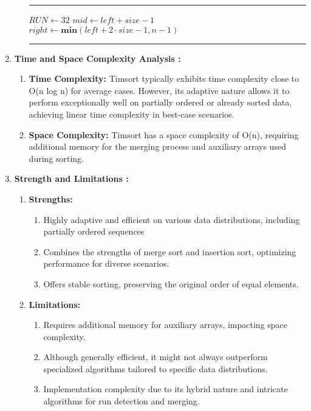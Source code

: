 \documentclass[conference]{IEEEtran}
\makeatletter
\newenvironment{breakablealgorithm}
  {%
     \refstepcounter{algorithm}%
     \hrule height.8pt depth0pt \kern2pt%
     \renewcommand{\caption}[2][\relax]{%
       {\raggedright\textbf{\fname@algorithm~\thealgorithm} ##2\par}%
       \ifx\relax##1\relax %
         \addcontentsline{loa}{algorithm}{\protect\numberline{\thealgorithm}##2}%
       \else %
         \addcontentsline{loa}{algorithm}{\protect\numberline{\thealgorithm}##1}%
       \fi
       \kern2pt\hrule\kern2pt
     }
  }{%
     \kern2pt\hrule\relax%
  }
\makeatother
\begin{document}
\begin{enumerate}
\begin{enumerate}
\begin{breakablealgorithm}
\begin{algorithmic}[1]
					\State $RUN \gets 32$
						\State {}
					\EndFor
							\State $mid \gets left + size - 1$
							\State $right \gets \textbf{min}(left + 2 \cdot size - 1, n - 1)$
								\State {}
							\EndIf
						\EndFor
					\EndFor
				\EndFunction
				\end{algorithmic}
			\end{breakablealgorithm}
	\end{enumerate}
	
	\item  \textbf{Time and Space Complexity Analysis : } \begin{enumerate}
		\item \textbf{Time Complexity:}  Timsort typically exhibits time complexity close to O(n log n) for average cases. However, its adaptive nature allows it to perform exceptionally well on partially ordered or already sorted data, achieving linear time complexity in best-case scenarios.
	    \item \textbf{Space Complexity:} Timsort has a space complexity of O(n), requiring additional memory for the merging process and auxiliary arrays used during sorting.
	\end{enumerate}
	\item \textbf{Strength and Limitations : }
	      \begin{enumerate}
			\item \textbf{Strengths: }
			\begin{enumerate}
				\item Highly adaptive and efficient on various data distributions, including partially ordered sequences
				\item Combines the strengths of merge sort and insertion sort, optimizing performance for diverse scenarios.
				\item Offers stable sorting, preserving the original order of equal elements.
			\end{enumerate}







			\item \textbf{Limitations: }
			\begin{enumerate}
				\item Requires additional memory for auxiliary arrays, impacting space complexity.
				\item Although generally efficient, it might not always outperform specialized algorithms tailored to specific data distributions.
				\item Implementation complexity due to its hybrid nature and intricate algorithms for run detection and merging.
			\end{enumerate}


\end{enumerate}
\end{enumerate}
\end{document}
